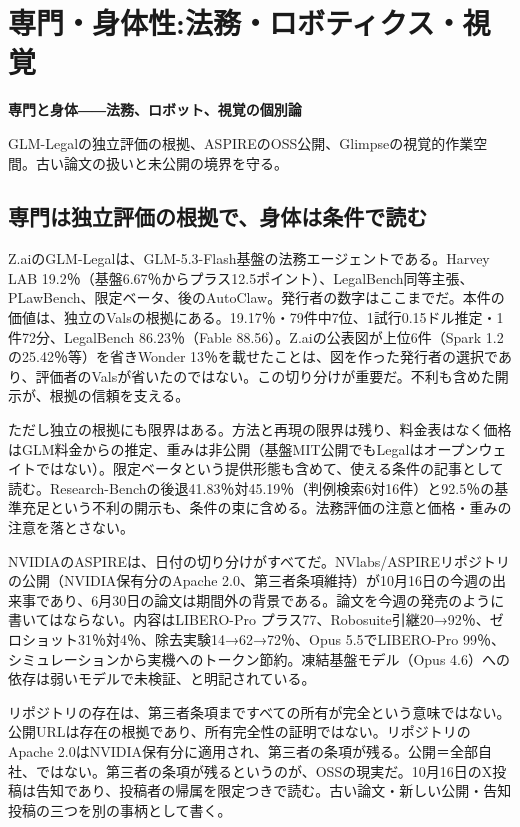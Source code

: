 \documentclass[lualatex,a4paper,10pt]{jlreq}
\begin{document}
\section{専門・身体性:法務・ロボティクス・視覚}
\label{sec:P7}

{\Large\bfseries 専門と身体――法務、ロボット、視覚の個別論\par}
\smallskip
{\color{SurveyMuted}GLM-Legalの独立評価の根拠、ASPIREのOSS公開、Glimpseの視覚的作業空間。古い論文の扱いと未公開の境界を守る。\par}
\bigskip

\subsection*{専門は独立評価の根拠で、身体は条件で読む}

Z.aiのGLM-Legalは、GLM-5.3-Flash基盤の法務エージェントである。Harvey LAB 19.2％（基盤6.67％からプラス12.5ポイント）、LegalBench同等主張、PLawBench、限定ベータ、後のAutoClaw。発行者の数字はここまでだ。本件の価値は、独立のValsの根拠にある。19.17％・79件中7位、1試行0.15ドル推定・1件72分、LegalBench 86.23％（Fable 88.56）。Z.aiの公表図が上位6件（Spark 1.2の25.42％等）を省きWonder 13％を載せたことは、図を作った発行者の選択であり、評価者のValsが省いたのではない。この切り分けが重要だ。不利も含めた開示が、根拠の信頼を支える。
\cite{B53,B54,B55}


ただし独立の根拠にも限界はある。方法と再現の限界は残り、料金表はなく価格はGLM料金からの推定、重みは非公開（基盤MIT公開でもLegalはオープンウェイトではない）。限定ベータという提供形態も含めて、使える条件の記事として読む。Research-Benchの後退41.83％対45.19％（判例検索6対16件）と92.5％の基準充足という不利の開示も、条件の束に含める。法務評価の注意と価格・重みの注意を落とさない。
\cite{B53,B54,B55}


NVIDIAのASPIREは、日付の切り分けがすべてだ。NVlabs/ASPIREリポジトリの公開（NVIDIA保有分のApache 2.0、第三者条項維持）が10月16日の今週の出来事であり、6月30日の論文は期間外の背景である。論文を今週の発売のように書いてはならない。内容はLIBERO-Pro プラス77、Robosuite引継20→92％、ゼロショット31％対4％、除去実験14→62→72％、Opus 5.5でLIBERO-Pro 99％、シミュレーションから実機へのトークン節約。凍結基盤モデル（Opus 4.6）への依存は弱いモデルで未検証、と明記されている。
\cite{B56,B57}


リポジトリの存在は、第三者条項まですべての所有が完全という意味ではない。公開URLは存在の根拠であり、所有完全性の証明ではない。リポジトリのApache 2.0はNVIDIA保有分に適用され、第三者の条項が残る。公開＝全部自社、ではない。第三者の条項が残るというのが、OSSの現実だ。10月16日のX投稿は告知であり、投稿者の帰属を限定つきで読む。古い論文・新しい公開・告知投稿の三つを別の事柄として書く。
\cite{B56,B57}
\end{document}
